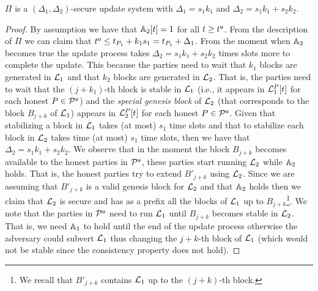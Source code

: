 \begin{theorem}
$\Pi$ is a $(\Delta_1,\Delta_2)$-secure update system with $\Delta_1=s_1 k_1$ and $\Delta_2=s_1 k_1 + s_2 k_2$.
\end{theorem}

\begin{proof}
By assumption we have that $\mathbb{A}_2[t]=1$ for all $t\geq t^{\mathsf{u}}$. From the description of $\Pi$ we can claim that $t^{\mathsf{u}} \leq t_{P_1}+k_1 s_1=t_{P_1}+\Delta_1$.
From the moment when $\mathbb{A}_2$ becomes true the update process takes $\Delta_2=s_1 k_1 + s_2 k_2$  times slots more to complete the update.
This because the parties need to wait that $k_1$ blocks are generated in $\mathcal{L}_1$ and that $k_2$ blocks are generated in $\mathcal{L}_2$. 
That is, the parties need to wait that the $(j+k_1)$-th block is stable in $\mathcal{L}_1$ (i.e., 
it appears in $\mathcal{L}_1^P[t]$ for each honest $P\in\mathcal{P}^\mathsf{u}$) and the \emph{special genesis block} of $\mathcal{L}_2$ (that corresponds to the block $B_{j+k}$ of $\mathcal{L}_1$) appears 
in $\mathcal{L}_2^P[t]$ for each honest $P\in\mathcal{P}^\mathsf{u}$. Given that stabilizing a block in $\mathcal{L}_1$ takes (at most) $s_1$ time slots and that to stabilize
each block in $\mathcal{L}_2$ takes time (at most) $s_1$ time slots, then we have that $\Delta_2=s_1 k_1 + s_2 k_2$.
We observe that in the moment the block $B_{j+k}$ becomes available to the honest parties in $\mathcal{P}^\mathsf{u}$, these parties start running $\mathcal{L}_2$ while $\mathbb{A}_2$ holds.
That is, the honest parties try to extend $B'_{j+k}$ using $\mathcal{L}_2$. Since we are assuming that $B'_{j+k}$  is a valid genesis block for $\mathcal{L}_2$ and 
that $\mathbb{A}_2$ holds then we claim that $\mathcal{L}_2$ is secure and has as a prefix all the blocks of $\mathcal{L}_1$ up to $B_{j+k}$\footnote{We recall that $B'_{j+k}$
contains $\mathcal{L}_1$ up to the $(j+k)$-th block.}. We note that the parties in $\mathcal{P}^\mathsf{u}$ need to run $\mathcal{L}_1$ until $B_{j+k}$ becomes stable in $\mathcal{L}_2$. That is, we need $\mathbb{A}_1$ to
hold until the end of the update process otherwise the adversary could subvert $\mathcal{L}_1$ thus changing the $j+k$-th block of $\mathcal{L}_1$ (which would not be stable
since the consistency property does not hold).

\end{proof}
